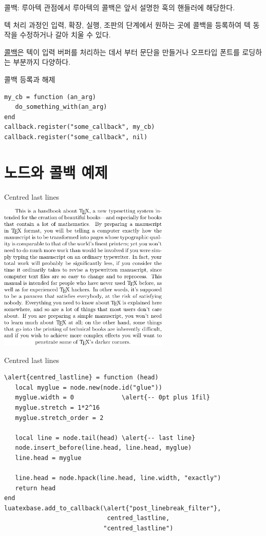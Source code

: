 \documentclass[t,10pt]{beamer}
\begin{document}
\begin{frame}[fragile]{콜백: 루아텍 관점에서}
  루아텍의 콜백은 앞서 설명한 훅의 핸들러에 해당한다.

  텍 처리 과정인 \alert{입력, 확장, 실행, 조판}의 단계에서 원하는
  곳에 콜백을 등록하여 텍 동작을 수정하거나 갈아 치울 수 있다.

  \alert{\href{http://wiki.luatex.org/index.php/Callbacks}{콜백}}은
  텍이 입력 버퍼를 처리하는 데서 부터 문단을 만들거나 오프타입 폰트를 로딩하는
  부분까지 다양하다.

  \medskip
  콜백 등록과 해제

  \begin{Verbatim}[fontsize=\small]
my_cb = function (an_arg)
   do_something_with(an_arg)
end
callback.register("some_callback", my_cb)
callback.register("some_callback", nil)
  \end{Verbatim}
\end{frame}

\section{노드와 콜백 예제}

\begin{frame}{Centred last lines}
  \begin{center}
    \includegraphics[width=3.2in]{lcenter.pdf}
  \end{center}
\end{frame}

\begin{frame}[fragile]{Centred last lines}
  \begin{Verbatim}[fontsize=\small,commandchars=\\\{\}]
\alert{centred_lastline} = function (head)
   local myglue = node.new(node.id("glue"))
   myglue.width = 0             \alert{-- 0pt plus 1fil}
   myglue.stretch = 1*2^16
   myglue.stretch_order = 2

   local line = node.tail(head) \alert{-- last line}
   node.insert_before(line.head, line.head, myglue)
   line.head = myglue

   line.head = node.hpack(line.head, line.width, "exactly")
   return head
end
luatexbase.add_to_callback(\alert{"post_linebreak_filter"},
                            centred_lastline,
                           "centred_lastline")
  \end{Verbatim}
\end{frame}
\end{document}
